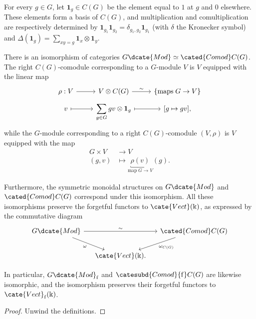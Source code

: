 For every $g\in G$, let $\mathbf{1}_g\in C(G)$ be the element equal to $1$ at $g$ and $0$ elsewhere. These elements form a basis of $C(G)$, and multiplication and comultiplication are respectively determined by $\mathbf{1}_{g_1}\mathbf{1}_{g_2}=\delta_{g_1,g_2}\mathbf{1}_{g_1}$ (with $\delta$ the Kronecker symbol) and $\Delta(\mathbf{1}_g)=\sum_{xy=g}\mathbf{1}_x\otimes\mathbf{1}_y$.

\begin{proposition}\label{prop:Rep-comod-fiber}
	There is an isomorphism of categories $G\dcate{Mod}\simeq\cated{Comod}C(G)$. The right $C(G)$-comodule corresponding to a $G$-module $V$ is $V$ equipped with the linear map
	\[\begin{tikzcd}[row sep=tiny]
		\rho: V \arrow[r] & V \otimes C(G) \arrow[r, "\sim"] & \left\{\text{maps}\; G \to V \right\} \\
		v \arrow[mapsto, r] & \displaystyle\sum_{g \in G} gv \otimes \mathbf{1}_g \arrow[mapsto, r] & {[g \mapsto gv]},
	\end{tikzcd}\]
	while the $G$-module corresponding to a right $C(G)$-comodule $(V,\rho)$ is $V$ equipped with the map
	\begin{align*}
		G \times V & \to V \\
		(g, v) & \mapsto \underbracket{\rho(v)}_{\text{map}\; G \to V}(g).
	\end{align*}

	Furthermore, the symmetric monoidal structures on $G\dcate{Mod}$ and $\cated{Comod}C(G)$ correspond under this isomorphism. All these isomorphisms preserve the forgetful functors to $\cate{Vect}(\Bbbk)$, as expressed by the commutative diagram
	\[\begin{tikzcd}[column sep=small]
		G\dcate{Mod} \arrow[rr, "\sim"] \arrow[rd, "\omega"'] & & \cated{Comod}C(G) \arrow[ld, "{\omega_{C(G)}}"] \\
		& \cate{Vect}(\Bbbk). &
	\end{tikzcd}\]

	In particular, $G\dcate{Mod}_{\mathrm{f}}$ and $\catesubd{Comod}{\mathrm{f}}C(G)$ are likewise isomorphic, and the isomorphism preserves their forgetful functors to $\cate{Vect}_{\mathrm{f}}(\Bbbk)$.
\end{proposition}
\begin{proof}
	Unwind the definitions.
\end{proof}


